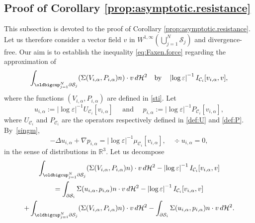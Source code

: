 \documentclass[JEP,XML,SOM,Unicode, NoEqCountersInSection,NoFloatCountersInSection,published]{cedram}
\newcommand{\R}{\mathbb{R}}
\let\eps\varepsilon
\theoremstyle{definition}
\theoremstyle{remark}
\begin{document}
\subsection{Proof of Corollary \ref{prop:asymptotic.resistance}}
\label{sec-prop:asymptotic.resistance}
This subsection is devoted to the proof of Corollary \ref{prop:asymptotic.resistance}.
Let us therefore consider a vector field $v $ in $W^{1,\infty}(\bigcup_{j=1}^N \mathcal S_j)$ and divergence-free.
Our aim is to establish the inequality \eqref{eq:Faxen.force}
regarding the approximation of
\begin{equation}
\int_{\oldbigcup_{j=1}^N \partial \mathcal S_j} (\Sigma (V_{i,\alpha}, P_{i,\alpha}) n) \cdot v \, d\mathcal{H}^2 \quad \text{by} \quad
\left|\log \eps\right|^{-1}
I_{\mathcal{C}_i } [v_{i,\alpha}, v], \end{equation}
where the functions $(V_{i,\alpha},P_{i,\alpha})$ are defined in \eqref{sti}.
Let
\begin{equation}
u_{i,\alpha} := \left|\log \eps\right|^{-1} U_{\mathcal C_i}[v_{i,\alpha}] \quad \text{ and } \quad
p_{i,\alpha} := \left|\log \eps\right|^{-1} P_{\mathcal C_i}[v_{i,\alpha}],
\end{equation}
where $U_{\mathcal C_i}$ and $P_{\mathcal C_i}$ are the operators respectively defined in \eqref{def:U} and \eqref{def:P}. By~\eqref{singm},
\begin{equation}
\label{dela}
-\Delta u_{i,\alpha} + \nabla p_{i,\alpha} = \left|\log \eps\right|^{-1} \mu_{\mathcal C_i}[v_{i,\alpha}], \quad \div u_{i,\alpha} = 0,
\end{equation}
in the sense of distributions in $\R^3$.
Let us decompose
\begin{multline}
\label{decompos}
\int_{\oldbigcup_{j=1}^N \partial \mathcal S_j} (\Sigma (V_{i,\alpha}, P_{i,\alpha}) n) \cdot v \, d\mathcal{H}^2 - \left|\log \eps\right|^{-1}
I_{\mathcal{C}_i } [v_{i,\alpha}, v]
\\
= \int_{\partial \mathcal S_{i}} \Sigma(u_{i,\alpha},p_{i,\alpha}) n \cdot v \, d\mathcal{H}^2
- \left|\log \eps\right|^{-1} I_{\mathcal{C}_i } [v_{i,\alpha},v]
\\ + \int_{\oldbigcup_{j=1}^N \partial \mathcal S_j} (\Sigma (V_{i,\alpha}, P_{i,\alpha}) n) \cdot v \, d\mathcal{H}^2 - \int_{\partial \mathcal S_{i}} \Sigma(u_{i,\alpha},p_{i,\alpha}) n \cdot v \, d\mathcal{H}^2.
\end{multline}
\end{document}
